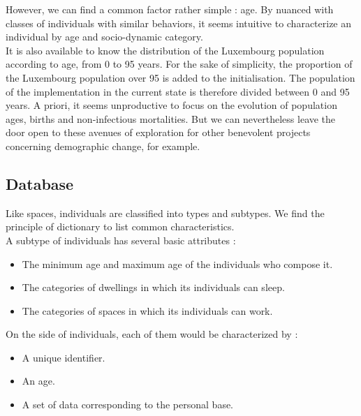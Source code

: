 However, we can find a common factor rather simple : age. By nuanced with classes of individuals with similar behaviors, it seems intuitive to characterize an individual by age and socio-dynamic category.\\

It is also available to know the distribution of the Luxembourg population according to age, from 0 to 95 years. For the sake of simplicity, the proportion of the Luxembourg population over 95 is added to the initialisation. The population of the implementation in the current state is therefore divided between 0 and 95 years. A priori, it seems unproductive to focus on the evolution of population ages, births and non-infectious mortalities. But we can nevertheless leave the door open to these avenues of exploration for other benevolent projects concerning demographic change, for example.\\

\subsection{Database}

Like spaces, individuals are classified into types and subtypes. We find the principle of dictionary to list common characteristics.\\

A subtype of individuals has several basic attributes :\\

\begin{itemize}
\item  The minimum age and maximum age of the individuals who compose it.
\item The categories of dwellings in which its individuals can sleep.
\item The categories of spaces in which its individuals can work.\\
\end{itemize}

On the side of individuals, each of them would be characterized by :\\

\begin{itemize}
\item A unique identifier.
\item An age.
\item A set of data corresponding to the personal base.\\
\end{itemize}

